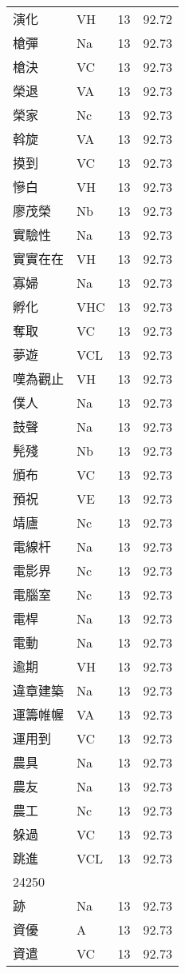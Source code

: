 \documentclass[twocolumn]{book}
\begin{document}
\begin{supertabular}{llrr}
演化 & VH & 13 &  92.72\\
槍彈 & Na & 13 &  92.73\\
槍決 & VC & 13 &  92.73\\
榮退 & VA & 13 &  92.73\\
榮家 & Nc & 13 &  92.73\\
斡旋 & VA & 13 &  92.73\\
摸到 & VC & 13 &  92.73\\
慘白 & VH & 13 &  92.73\\
廖茂榮 & Nb & 13 &  92.73\\
實驗性 & Na & 13 &  92.73\\
實實在在 & VH & 13 &  92.73\\
寡婦 & Na & 13 &  92.73\\
孵化 & VHC & 13 &  92.73\\
奪取 & VC & 13 &  92.73\\
夢遊 & VCL & 13 &  92.73\\
嘆為觀止 & VH & 13 &  92.73\\
僕人 & Na & 13 &  92.73\\
鼓聲 & Na & 13 &  92.73\\
髡殘 & Nb & 13 &  92.73\\
頒布 & VC & 13 &  92.73\\
預祝 & VE & 13 &  92.73\\
靖廬 & Nc & 13 &  92.73\\
電線杆 & Na & 13 &  92.73\\
電影界 & Nc & 13 &  92.73\\
電腦室 & Nc & 13 &  92.73\\
電桿 & Na & 13 &  92.73\\
電動 & Na & 13 &  92.73\\
逾期 & VH & 13 &  92.73\\
違章建築 & Na & 13 &  92.73\\
運籌帷幄 & VA & 13 &  92.73\\
運用到 & VC & 13 &  92.73\\
農具 & Na & 13 &  92.73\\
農友 & Na & 13 &  92.73\\
農工 & Nc & 13 &  92.73\\
躲過 & VC & 13 &  92.73\\
跳進 & VCL & 13 &  92.73\\
24250\\
跡 & Na & 13 &  92.73\\
資優 & A & 13 &  92.73\\
資遣 & VC & 13 &  92.73\\

\end{supertabular}
\end{document}
